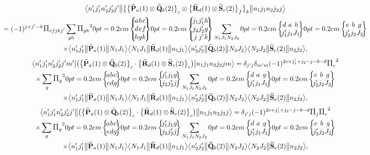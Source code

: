 \begin{multline*}
\braOketred{n_{1}^{\prime} j_{1}^{\prime} n_{2}^{\prime} j_{2}^{\prime} j^{\prime}}{\bigl\{\bigl\{\widehat{\vect{P}}_{a}(1) \otimes \widehat{\vect{Q}}_{b}(2)\bigr\}_{c} \otimes\bigl\{\widehat{\vect{R}}_{d}(1) \otimes \widehat{\vect{S}}_{e}(2)\bigr\}_{f}\bigr\}_{k}}{n_{1} j_{1} n_{2} j_{2} j}\\
=(-1)^{j+j^{\prime}-k} \Fact{c f j k j^{\prime}}
\sum_{g h} \Fact{g h}^{2}
\ninej{a}{b}{c}{d}{e}{f}{h}{g}{k}
\ninej{j_{1}}{j_{1}^{\prime}}{h}{j_{2}}{j_{2}^{\prime}}{g}{j}{j^{\prime}}{k} 
 \sum_{N_{1} J_{1} N_{2} J_{2}}
\sixj{d}{a}{h}{j_{1}^{\prime}}{j_{1}}{J_{1}}
\sixj{e}{b}{g}{j_{2}^{\prime}}{j_{2}}{J_{2}}\\
\times\braOketred{ n_{1}^{\prime} j_{1}^{\prime}}{\widehat{\vect{P}}_{a}(1)}{ N_{1} J_{1}}
\braOketred{ N_{1} J_{1}}{\widehat{\vect{R}}_{d}(1)}{ n_{1} j_{1}}
\braOketred{ n_{2}^{\prime} j_{2}^{\prime}}{\widehat{\vect{Q}}_{b}(2)}{ N_{2} J_{2}}
\braOketred{ N_{2} J_{2}}{\widehat{\vect{S}}_{e}(2)}{ n_{2} j_{2}},
\end{multline*}
\begin{multline} 
\braOket{ n_{1}^{\prime} j_{1}^{\prime} n_{2}^{\prime} j_{2}^{\prime} j^{\prime} m^{\prime}}{\bigl(\bigl\{\widehat{\vect{P}}_{a}(1) \otimes \widehat{\vect{Q}}_{b}(2)\bigr\}_{c} \cdot\bigl\{\widehat{\vect{R}}_{d}(1) \otimes \widehat{\vect{S}}_{e}(2)\bigr\}_{c}\bigr)}{n_{1} j_{1} n_{2} j_{2} j m}=\delta_{j^{\prime} j} \delta_{m^{\prime} m}(-1)^{2 c+j_{1}^{\prime}+j_{2}-j-b-d} \Fact{c}^{2} \\
 \times \sum_{g} \Fact{g}^{2}
\sixj{a}{b}{c}{e}{d}{g}
\sixj{j_{1}^{\prime}}{j_{1}}{g}{j_{2}}{j_{2}^{\prime}}{j} \sum_{N_{1} J_{1} N_{2} J_{2}}
\sixj{d}{a}{g}{j_{1}^{\prime}}{j_{1}}{J_{1}}
\sixj{e}{b}{g}{j_{2}^{\prime}}{j_{2}}{J_{2}} \\
 \times
\braOketred{ n_{1}^{\prime} j_{1}^{\prime}}{\widehat{\vect{P}}_{a}(1)}{ N_{1} J_{1}}
\braOketred{ N_{1} J_{1}}{\widehat{\vect{R}}_{d}(1)}{ n_{1} j_{1}}
\braOketred{ n_{2}^{\prime} j_{2}^{\prime}}{\widehat{\vect{Q}}_{b}(2)}{ N_{2} J_{2}}
\braOketred{N_{2} J_{2}}{\widehat{\vect{S}}_{e}(2)}{ n_{2} j_{2}}, \label{eq:13:1:35}
\end{multline}
\begin{multline*}
\braOketred{ n_{1}^{\prime} j_{1}^{\prime} n_{2}^{\prime} j_{2}^{\prime} j^{\prime}}{\bigl(\bigl\{\widehat{\vect{P}}_{a}(1) \otimes \widehat{\vect{Q}}_{b}(2)\bigr\}_{c} \cdot\bigl\{\widehat{\vect{R}}_{d}(1) \otimes \widehat{\vect{S}}_{e}(2)\bigr\}_{c}\bigr)}{n_{1} j_{1} n_{2} j_{2} j}=\delta_{j^{\prime} j}(-1)^{2 c+j_{1}^{\prime}+j_{2}-j-b-d} \Fact{j} \Fact{c}^{2} \\
\times \sum_{g} \Fact{g}^{2}
\sixj{a}{b}{c}{e}{d}{g}
\sixj{j_{1}^{\prime}}{j_{1}}{g}{j_{2}}{j_{2}^{\prime}}{j} \sum_{N_{1} J_{1} N_{2} J_{2}}
\sixj{d}{a}{g}{j_{1}^{\prime}}{j_{1}}{J_{1}}
\sixj{e}{b}{g}{j_{2}^{\prime}}{j_{2}}{J_{2}} \\
\times
\braOketred{ n_{1}^{\prime} j_{1}^{\prime}}{\widehat{\vect{P}}_{a}(1)}{ N_{1} J_{1}}
\braOketred{ N_{1} J_{1}}{\widehat{\vect{R}}_{d}(1)}{ n_{1} j_{1}}
\braOketred{ n_{2}^{\prime} j_{2}^{\prime}}{\widehat{\vect{Q}}_{b}(2)}{ N_{2} J_{2}}
\braOketred{N_{2} J_{2}}{\widehat{\vect{S}}_{e}(2)}{ n_{2} j_{2}},
\end{multline*}
